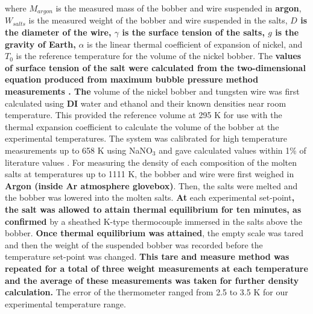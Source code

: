 \documentclass[review]{elsarticle}
\providecommand{\DIFaddtex}[1]{{\bf #1}} %
\providecommand{\DIFdeltex}[1]{} %
\providecommand{\DIFaddbegin}{\protect\color{blue}} %
\providecommand{\DIFaddend}{\protect\color{black}} %
\providecommand{\DIFdelbegin}{\protect\color{red}} %
\providecommand{\DIFdelend}{\protect\color{black}} %
\providecommand{\DIFadd}[1]{\texorpdfstring{\DIFaddtex{#1}}{#1}} %
\providecommand{\DIFdel}[1]{\texorpdfstring{\DIFdeltex{#1}}{}} %
\newcommand{\DIFscaledelfig}{0.5}
\newlength{\DIFdelgraphicswidth} %
\newlength{\DIFdelgraphicsheight} %
\newcommand{\DIFaddincludegraphics}[2][]{{\color{blue}\fbox{\DIFOincludegraphics[#1]{#2}}}} %
\newcommand{\DIFdelincludegraphics}[2][]{%
\sbox{\DIFdelgraphicsbox}{\DIFOincludegraphics[#1]{#2}}%
\settoboxwidth{\DIFdelgraphicswidth}{\DIFdelgraphicsbox} %
\settoboxtotalheight{\DIFdelgraphicsheight}{\DIFdelgraphicsbox} %
\scalebox{\DIFscaledelfig}{%
\parbox[b]{\DIFdelgraphicswidth}{\usebox{\DIFdelgraphicsbox}\\[-\baselineskip] \rule{\DIFdelgraphicswidth}{0em}}\llap{\resizebox{\DIFdelgraphicswidth}{\DIFdelgraphicsheight}{%
\setlength{\unitlength}{\DIFdelgraphicswidth}%
\begin{picture}(1,1)%
\thicklines\linethickness{2pt} %
{\color[rgb]{1,0,0}\put(0,0){\framebox(1,1){}}}%
{\color[rgb]{1,0,0}\put(0,0){\line( 1,1){1}}}%
{\color[rgb]{1,0,0}\put(0,1){\line(1,-1){1}}}%
\end{picture}%
}\hspace*{3pt}}} %
} %
\DeclareRobustCommand{\DIFaddbegin}{\DIFOaddbegin \let\includegraphics\DIFaddincludegraphics} %
\DeclareRobustCommand{\DIFaddend}{\DIFOaddend \let\includegraphics\DIFOincludegraphics} %
\DeclareRobustCommand{\DIFdelbegin}{\DIFOdelbegin \let\includegraphics\DIFdelincludegraphics} %
\DeclareRobustCommand{\DIFdelend}{\DIFOaddend \let\includegraphics\DIFOincludegraphics} %
\begin{document}
where \DIFdelbegin \DIFdel{$M_{air}$ }\DIFdelend \DIFaddbegin \DIFadd{$M_{argon}$ }\DIFaddend is the measured mass of the bobber and wire suspended in \DIFdelbegin \DIFdel{air}\DIFdelend \DIFaddbegin \DIFadd{argon}\DIFaddend , $W_{salts}$ is the measured weight of the bobber and wire suspended in the salts, \DIFaddbegin \DIFadd{$D$ is the diameter of the wire, $\gamma$ is the surface tension of the salts, $g$ is the gravity of Earth, }\DIFaddend $\alpha$ is the linear thermal coefficient of expansion of nickel, and $T_0$ is the reference temperature for the volume of the nickel bobber. The \DIFaddbegin \DIFadd{values of surface tension of the salt were calculated from the two-dimensional equation produced from maximum bubble pressure method measurements \cite{janz1975molten}. The }\DIFaddend volume of the nickel bobber and tungsten wire was first calculated using \DIFdelbegin \DIFdel{deionized }\DIFdelend \DIFaddbegin \DIFadd{DI }\DIFaddend water and ethanol and their known densities near room temperature. This provided the reference volume at 295 K for use with the thermal expansion coefficient to calculate the volume of the bobber at the experimental temperatures. The system was calibrated for high temperature measurements up to 658 K using NaNO$_{3}$ and gave calculated values within 1\% of literature values \DIFdelbegin \DIFdel{were obtained }\DIFdelend \cite{Janz1972}. For measuring the density of each composition of the molten salts at temperatures up to 1111 K, the bobber and wire were first weighed in \DIFdelbegin \DIFdel{air}\DIFdelend \DIFaddbegin \DIFadd{Argon (inside Ar atmosphere glovebox)}\DIFaddend . Then, the salts were melted and the bobber was lowered into the molten salts. \DIFdelbegin \DIFdel{Ten minutes of stable thermal equilibrium was confirmed at }\DIFdelend \DIFaddbegin \DIFadd{At }\DIFaddend each experimental set-point\DIFaddbegin \DIFadd{, the salt was allowed to attain thermal equilibrium for ten minutes, as confirmed }\DIFaddend by a sheathed K-type thermocouple immersed in the salts above the bobber. \DIFdelbegin \DIFdel{After this confirmation of thermal equilibrium }\DIFdelend \DIFaddbegin \DIFadd{Once thermal equilibrium was attained}\DIFaddend , the empty scale was tared and then the weight of the suspended bobber was recorded before the temperature set-point was changed. \DIFaddbegin \DIFadd{This tare and measure method was repeated for a total of three weight measurements at each temperature and the average of these measurements was taken for further density calculation. }\DIFaddend The error of the thermometer ranged from 2.5 to 3.5 K for our experimental temperature range.
\end{document}

